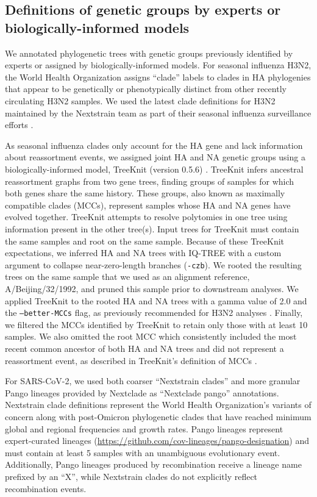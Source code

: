 \documentclass[webpdf,contemporary,large,single]{oup-authoring-template}%
\theoremstyle{thmstyleone}%
\theoremstyle{thmstyletwo}%
\theoremstyle{thmstylethree}%
\begin{document}
\subsection{Definitions of genetic groups by experts or biologically-informed models}

We annotated phylogenetic trees with genetic groups previously identified by experts or assigned by biologically-informed models.
For seasonal influenza H3N2, the World Health Organization assigns ``clade'' labels to clades in HA phylogenies that appear to be genetically or phenotypically distinct from other recently circulating H3N2 samples.
We used the latest clade definitions for H3N2 maintained by the Nextstrain team as part of their seasonal influenza surveillance efforts \citep{Neher2015}.

As seasonal influenza clades only account for the HA gene and lack information about reassortment events, we assigned joint HA and NA genetic groups using a biologically-informed model, TreeKnit (version 0.5.6) \citep{Barrat-Charlaix2022}.
TreeKnit infers ancestral reassortment graphs from two gene trees, finding groups of samples for which both genes share the same history.
These groups, also known as maximally compatible clades (MCCs), represent samples whose HA and NA genes have evolved together.
TreeKnit attempts to resolve polytomies in one tree using information present in the other tree(s).
Input trees for TreeKnit must contain the same samples and root on the same sample.
Because of these TreeKnit expectations, we inferred HA and NA trees with IQ-TREE with a custom argument to collapse near-zero-length branches (\texttt{-czb}).
We rooted the resulting trees on the same sample that we used as an alignment reference, A/Beijing/32/1992, and pruned this sample prior to downstream analyses.
We applied TreeKnit to the rooted HA and NA trees with a gamma value of 2.0 and the \texttt{--better-MCCs} flag, as previously recommended for H3N2 analyses \citep{Barrat-Charlaix2022}.
Finally, we filtered the MCCs identified by TreeKnit to retain only those with at least 10 samples.
We also omitted the root MCC which consistently included the most recent common ancestor of both HA and NA trees and did not represent a reassortment event, as described in TreeKnit's definition of MCCs \citep{Barrat-Charlaix2022}.

For SARS-CoV-2, we used both coarser ``Nextstrain clades'' \citep{Hodcroft2020,Bedford2021,Roemer2022} and more granular Pango lineages \citep{OToole2021} provided by Nextclade as ``Nextclade pango'' annotations.
Nextstrain clade definitions represent the World Health Organization's variants of concern along with post-Omicron phylogenetic clades that have reached minimum global and regional frequencies and growth rates.
Pango lineages represent expert-curated lineages (\href{https://github.com/cov-lineages/pango-designation}{https://github.com/cov-lineages/pango-designation}) and must contain at least 5 samples with an unambiguous evolutionary event.
Additionally, Pango lineages produced by recombination receive a lineage name prefixed by an ``X'', while Nextstrain clades do not explicitly reflect recombination events.
\end{document}
